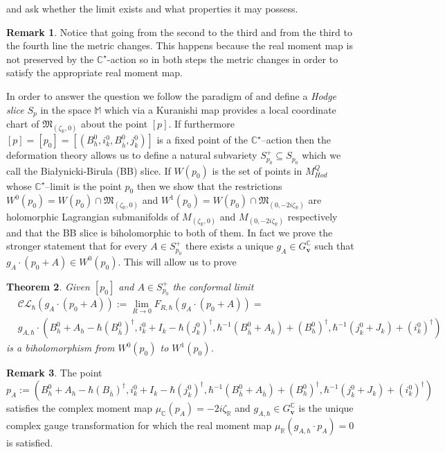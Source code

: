 \documentclass[12pt,oneside,reqno]{amsart}
\newtheorem{theorem}{Theorem}
\theoremstyle{definition}
\newtheorem{remark}[theorem]{Remark}
\numberwithin{equation}{section}
\numberwithin{theorem}{section}
\newcommand{\R}{\mathbb{R}}
\newcommand{\C}{\mathbb{C}}
\renewcommand{\subset}{\subseteq}
\begin{document}
%
and ask whether the limit exists and what properties it may possess. 
%
\begin{remark}
Notice that going from the second to the third and from the third to the fourth line the metric changes. This happens because the real moment map is not preserved by the $\C^{\star}$-action so in both steps the metric changes in order to satisfy the appropriate real moment map. 
\end{remark}
%
In order to answer the question we follow the paradigm of \cite{CW} and define a \emph{Hodge slice} $S_p$ in the space $\mathbb M$ which via a Kuranishi map provides a local coordinate chart of $\mathfrak M_{(\zeta_{\R},0)}$ about the point $[p]$. If furthermore $[p] = [p_0] = [(B_h^0,i_k^0,B_{\bar h}^0,j_k^0)]$ is a fixed point of the $\C^{\star}$--action then the deformation theory allows us to define a natural subvariety $S^+_{p_0}\subset S_{p_0}$ which we call the Bia\l{}ynicki-Birula (BB) slice. If $W(p_0)$ is the set of points in $M^Q_{Hod}$ whose $\C^{\star}$--limit is the point $p_0$ then we show that the restrictions $W^0(p_0) = W(p_0)\cap\mathfrak M_{(\zeta_{\R},0)}$ and $W^1(p_0) = W(p_0)\cap\mathfrak M_{(0,-2i\zeta_{\R})}$ are holomorphic Lagrangian submanifolds of $M_{(\zeta_{\R},0)}$ and $M_{(0,-2i\zeta_{\R})}$ respectively and that the BB slice is biholomorphic to both of them. In fact we prove the stronger statement that for every $A\in S^+_{p_0}$ there exists a unique $g_A\in G_{\mathbf{v}}^{\C}$ such that $g_A\cdot(p_0+A)\in W^0(p_0)$. This will allow us to prove 
%
\begin{theorem}\label{main}
Given $[p_0]$ and $A\in S^+_{p_0}$ the conformal limit 
%
\begin{equation}
\begin{split}
&\mathcal {CL}_{\hbar}(g_A\cdot(p_0+A)):= \lim\limits_{R\to  0}F_{R,\hbar}(g_A\cdot(p_0+A)) =\\ &g_{A,\hbar}\cdot(B_h^0+A_h - \hbar(B_{\bar h}^0)^{\dagger}, i_k^0+ I_k - \hbar(j_k^0)^{\dagger}, \hbar^{-1}(B_{\bar h}^0 + A_{\bar h}) + (B_h^0)^{\dagger}, \hbar^{-1}(j_k^0+J_k)+(i_k^0)^{\dagger})
\end{split}
\end{equation}
%
is a biholomorphism from $W^0(p_0)$ to $W^1(p_0)$. 
\end{theorem}
%
%
\begin{remark}
The point 
%
\begin{equation}\label{explicit}
p_A:= (B_h^0+A_h - \hbar(B_{\bar h})^{\dagger}, i_k^0+ I_k - \hbar(j_k^0)^{\dagger}, \hbar^{-1}(B_{\bar h}^0 + A_{\bar h}) + (B_h^0)^{\dagger}, \hbar^{-1}(j_k^0+J_k)+(i_k^0)^{\dagger})
\end{equation}
%
satisfies the complex moment map $\mu_{\C}(p_A) =-2i\zeta_{\R}$ and $g_{A,\hbar}\in G_{\mathbf{v}}^{\C}$ is the unique complex gauge transformation for which the real moment map $\mu_{\R}(g_{A,\hbar}\cdot p_A)=0$ is satisfied. 
\end{remark}
\end{document}
